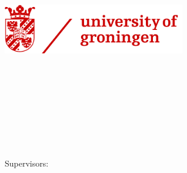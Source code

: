 \begin{titlepage}
	\includegraphics[width=8cm]{gfx/RUG_logo.png} \\
    \begin{center}	
		\vfill
		\vfill
		\vfill
		\vfill
       	\vfill
       	
       	\large
       	\begingroup
       	\HRule{0.5pt} \\
       	\huge
            \color{Maroon}{\myTitle} \\ \bigskip
        \color{Black}
        \HRule{0.5pt}
        \endgroup
        
		\vfill
		\vfill
		\vfill
		\vfill
		
		\Large
		\spacedlowsmallcaps{\myName} \\
		\myDegree \\
		
		\vfill
		\vfill
		
		\myTime
		
		\vfill
		\vfill
		
		\normalsize
		\myDepartment \\
		\myFaculty \\
		\myUni
		
		\vfill
		
		Supervisors: \\
		\myProf \\
		\myOtherProf
		
    \end{center}
\end{titlepage}
